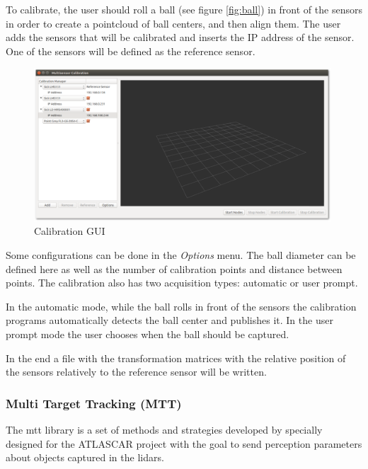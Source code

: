To calibrate, the user should roll a ball (see figure \ref{fig:ball}) in front of the sensors in order to create a pointcloud of ball centers, and then align them. The user adds the sensors that will be calibrated and inserts the IP address of the sensor. One of the sensors will be defined as the reference sensor. 

\begin{figure}[htp]
	
	\centering
	\includegraphics[width=0.99\textwidth]{capcalib/imgs/calibgui.png}
	
	\caption{Calibration GUI}
	\label{fig:calibgui}
	
\end{figure}

Some configurations can be done in the \textit{Options} menu. The ball diameter can be defined here as well as the number of calibration points and distance between points. The calibration also has two acquisition types: automatic or user prompt. 

In the automatic mode, while the ball rolls in front of the sensors the calibration programs automatically detects the ball center and publishes it. In the user prompt mode the user chooses when the ball should be captured.

In the end a file with the transformation matrices with the relative position of the sensors relatively to the reference sensor will be written.

\subsubsection{Multi Target Tracking (MTT)}

The \gls{mtt} library is a set of methods and strategies developed by \cite{SoaresDeAlmeida2016a} specially designed for the ATLASCAR project with the goal to send perception parameters about objects captured in the \gls{lidar}s. 


